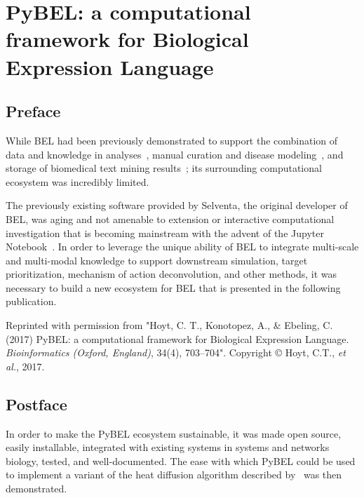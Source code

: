 \chapter{PyBEL: a computational framework for Biological Expression Language}
\label{ch:pybel}

\section*{Preface}

While \ac{BEL} had been previously demonstrated to support the combination of data and knowledge in analyses~\cite{Martin2012,Laifenfeld2012,Catlett2013,Martin2014,Vasilyev2014,Laifenfeld2014}, manual curation and disease modeling~\cite{Kodamullil2015,Irin2015,Naz2016,Karki2017,Emon2017,Domingo-Fernandez2017}, and storage of biomedical text mining results~\cite{Lai2016,Madan2016,Rastegar-Mojarad2016,Ravikumar2017,Ali2017}; its surrounding computational ecosystem was incredibly limited.

The previously existing software provided by Selventa, the original developer of BEL, was aging and not amenable to extension or interactive computational investigation that is becoming mainstream with the advent of the Jupyter Notebook~\cite{Kluyver2016}.
In order to leverage the unique ability of \ac{BEL} to integrate multi-scale and multi-modal knowledge to support downstream simulation, target prioritization, mechanism of action deconvolution, and other methods, it was necessary to build a new ecosystem for \ac{BEL} that is presented in the following publication.

\vspace*{\fill}

Reprinted with permission from "Hoyt, C. T., Konotopez, A., \& Ebeling, C. (2017) PyBEL: a computational framework for Biological Expression Language. \textit{Bioinformatics (Oxford, England)}, 34(4), 703–704".
Copyright © Hoyt, C.T., \textit{et al.}, 2017.



\section*{Postface}

In order to make the PyBEL ecosystem sustainable, it was made open source, easily installable, integrated with existing systems in systems and networks biology, tested, and well-documented.
The ease with which PyBEL could be used to implement a variant of the heat diffusion algorithm described by~\cite{Leiserson2015} was then demonstrated.

